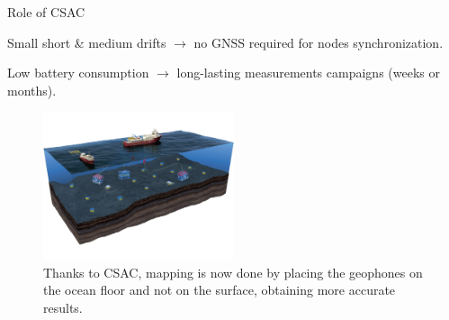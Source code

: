 \begin{frame}{Role of CSAC}

    Small short \& medium drifts $\rightarrow$ no GNSS required for nodes synchronization.

    Low battery consumption $\rightarrow$ long-lasting measurements campaigns (weeks or months).

    \begin{figure}
        \centering
        \includegraphics[width=0.5\textwidth]{img/OBS.png}
        \caption{Thanks to CSAC, mapping is now done by placing the geophones on the ocean floor and not on the surface, obtaining more accurate results.}
    \end{figure}

\end{frame}